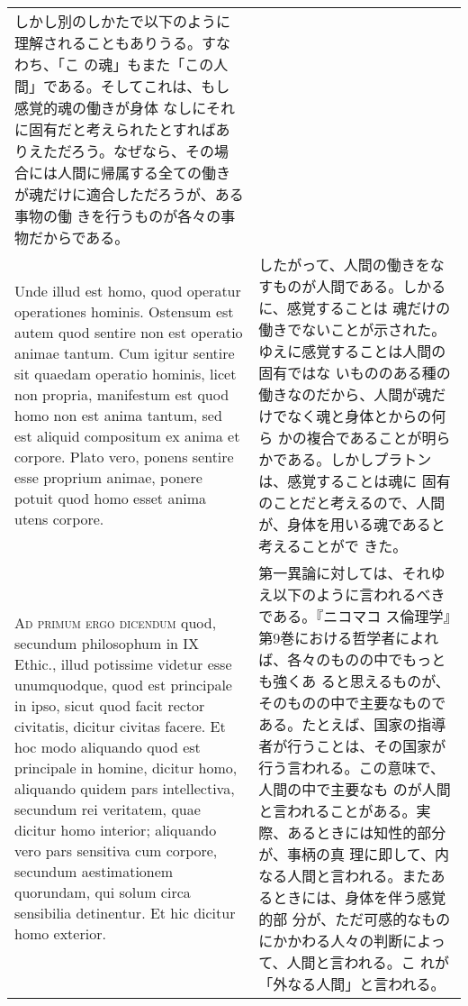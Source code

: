 \documentclass[paper=a4paper,fontsize=10pt,jafontsize=9pt,titlepage]{jlreq}
\begin{document}
\begin{longtable}{p{21em}p{21em}}
しかし別のしかたで以下のように理解されることもありうる。すなわち、「こ
の魂」もまた「この人間」である。そしてこれは、もし感覚的魂の働きが身体
なしにそれに固有だと考えられたとすればありえただろう。なぜなら、その場
合には人間に帰属する全ての働きが魂だけに適合しただろうが、ある事物の働
きを行うものが各々の事物だからである。


\\


Unde illud est homo, quod operatur operationes hominis. Ostensum est
autem quod sentire non est operatio animae tantum. Cum igitur sentire
sit quaedam operatio hominis, licet non propria, manifestum est quod
homo non est anima tantum, sed est aliquid compositum ex anima et
corpore. Plato vero, ponens sentire esse proprium animae, ponere
potuit quod homo esset anima utens corpore.


&

したがって、人間の働きをなすものが人間である。しかるに、感覚することは
魂だけの働きでないことが示された。ゆえに感覚することは人間の固有ではな
いもののある種の働きなのだから、人間が魂だけでなく魂と身体とからの何ら
かの複合であることが明らかである。しかしプラトンは、感覚することは魂に
固有のことだと考えるので、人間が、身体を用いる魂であると考えることがで
きた。

\\



{\scshape Ad primum ergo dicendum} quod, secundum philosophum in IX
Ethic., illud potissime videtur esse unumquodque, quod est principale
in ipso, sicut quod facit rector civitatis, dicitur civitas facere. Et
hoc modo aliquando quod est principale in homine, dicitur homo,
aliquando quidem pars intellectiva, secundum rei veritatem, quae
dicitur homo interior; aliquando vero pars sensitiva cum corpore,
secundum aestimationem quorundam, qui solum circa sensibilia
detinentur. Et hic dicitur homo exterior.


&

第一異論に対しては、それゆえ以下のように言われるべきである。『ニコマコ
ス倫理学』第9巻における哲学者によれば、各々のものの中でもっとも強くあ
ると思えるものが、そのものの中で主要なものである。たとえば、国家の指導
者が行うことは、その国家が行う言われる。この意味で、人間の中で主要なも
のが人間と言われることがある。実際、あるときには知性的部分が、事柄の真
理に即して、内なる人間と言われる。またあるときには、身体を伴う感覚的部
分が、ただ可感的なものにかかわる人々の判断によって、人間と言われる。こ
れが「外なる人間」と言われる。


\end{longtable}
\end{document}
